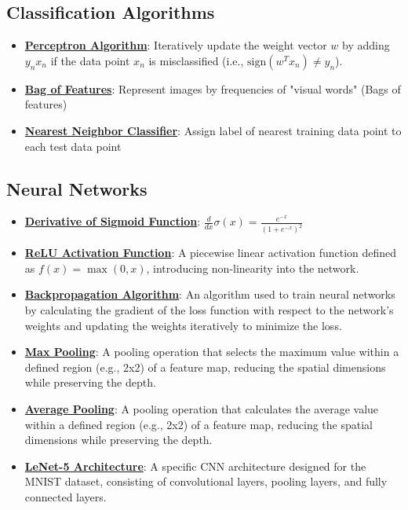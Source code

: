 \documentclass{article}%
\begin{document}
%
\subsection{Classification Algorithms}%
\label{subsec:ClassificationAlgorithms}%
\begin{itemize}[leftmargin=*]%
\item \href{https://www.math.purdue.edu/~yipn/351/05L2-ML Basics.pdf#page=30}{\textbf{Perceptron Algorithm}}: Iteratively update the weight vector $w$ by adding $y_nx_n$ if the data point $x_n$ is misclassified (i.e., $\text{sign}(w^Tx_n) \ne y_n$).%
\item \href{https://www.math.purdue.edu/~yipn/351/07L2-Vision.pdf#page=16}{\textbf{Bag of Features}}: Represent images by frequencies of "visual words" (Bags of features)%
\item \href{https://www.math.purdue.edu/~yipn/351/07L2-Vision.pdf#page=30}{\textbf{Nearest Neighbor Classifier}}: Assign label of nearest training data point to each test data point%
\end{itemize}

%
\subsection{Neural Networks}%
\label{subsec:NeuralNetworks}%
\begin{itemize}[leftmargin=*]%
\item \href{https://www.math.purdue.edu/~yipn/351/04L1-Linear Algebra Primer.pdf#page=21}{\textbf{Derivative of Sigmoid Function}}: $\frac{d}{dx} \sigma(x) = \frac{e^{-x}}{(1 + e^{-x})^2}$%
\item \href{https://www.math.purdue.edu/~yipn/351/09L1-cnn.pdf#page=13}{\textbf{ReLU Activation Function}}: A piecewise linear activation function defined as $f(x) = \max(0, x)$, introducing non-linearity into the network.%
\item \href{https://www.math.purdue.edu/~yipn/351/09L1-cnn.pdf#page=16}{\textbf{Backpropagation Algorithm}}: An algorithm used to train neural networks by calculating the gradient of the loss function with respect to the network's weights and updating the weights iteratively to minimize the loss.%
\item \href{https://www.math.purdue.edu/~yipn/351/09L1-cnn.pdf#page=14}{\textbf{Max Pooling}}: A pooling operation that selects the maximum value within a defined region (e.g., 2x2) of a feature map, reducing the spatial dimensions while preserving the depth.%
\item \href{https://www.math.purdue.edu/~yipn/351/09L1-cnn.pdf#page=15}{\textbf{Average Pooling}}: A pooling operation that calculates the average value within a defined region (e.g., 2x2) of a feature map, reducing the spatial dimensions while preserving the depth.%
\item \href{https://www.math.purdue.edu/~yipn/351/09L1-cnn.pdf#page=22}{\textbf{LeNet-5 Architecture}}: A specific CNN architecture designed for the MNIST dataset, consisting of convolutional layers, pooling layers, and fully connected layers.%
\end{itemize}
\end{document}
